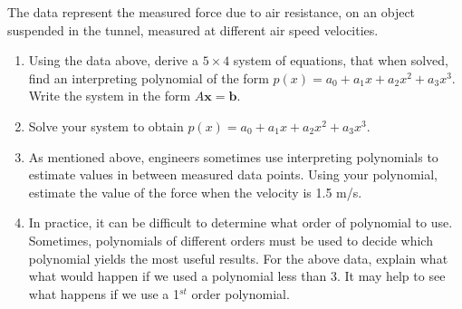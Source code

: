 The data represent the measured force due to air resistance, on an object suspended in the tunnel, measured at different air speed velocities.
\begin{enumerate}
\item Using the data above, derive a $5\times4$ system of equations, that when solved, find an interpreting polynomial of the form $p(x) = a_0+a_1x+a_2x^2+a_3x^3$. Write the system in the form $A\mathbf{x}=\mathbf{b}$.
\item Solve your system to obtain $p(x) = a_0+a_1x+a_2x^2+a_3x^3$.
\item As mentioned above, engineers sometimes use interpreting polynomials to estimate values in between measured data points. Using your polynomial, estimate the value of the force when the velocity is 1.5 m/s. 
\item In practice, it can be difficult to determine what order of polynomial to use. Sometimes, polynomials of different orders must be used to decide which polynomial yields the most useful results. For the above data, explain what what would happen if we used a polynomial less than 3. It may help to see what happens if we use a 1$^{st}$ order polynomial. 
\end{enumerate}


\EEN %



